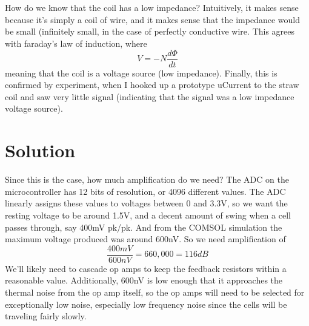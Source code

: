 \documentclass{article}
\begin{document}
\\ \\
How do we know that the coil has a low impedance? Intuitively, it makes sense
because it's simply a coil of wire, and it makes sense that the impedance would
be small (infinitely small, in the case of perfectly conductive wire. This
agrees with faraday's law of induction, where $$ V = -N \frac{d\Phi}{dt} $$
meaning that the coil is a voltage source (low impedance). Finally, this is
confirmed by experiment, when I hooked up a prototype uCurrent to the straw
coil and saw very little signal (indicating that the signal was a low impedance
voltage source). 
\\
\section{Solution}
Since this is the case, how much amplification do we need? The ADC on the
microcontroller has 12 bits of resolution, or 4096 different values. The ADC
linearly assigns these values to voltages between 0 and 3.3V, so we want the
resting voltage to be around 1.5V, and a decent amount of swing when a cell
passes through, say 400mV pk/pk. And from the COMSOL simulation the maximum
voltage produced was around 600nV. So we need amplification of
$$\frac{400mV}{600nV} = 660,000 = 116dB$$ We'll likely need to cascade op amps
to keep the feedback resistors within a reasonable value. Additionally, 600nV
is low enough that it approaches the thermal noise from the op amp itself, so
the op amps will need to be selected for exceptionally low noise, especially
low frequency noise since the cells will be traveling fairly slowly.
\\
\end{document}
